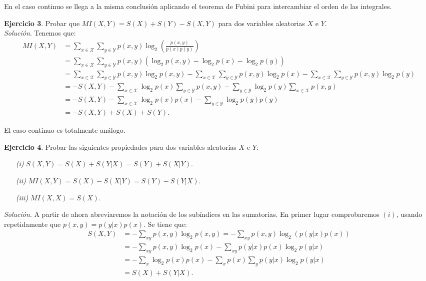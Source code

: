 \documentclass[11pt,a4paper]{article}
\begin{document}
En el caso continuo se llega a la misma conclusión aplicando el teorema de Fubini para intercambiar el orden de las integrales.

\vspace{1em}

\textbf{Ejercicio 3}. Probar que $MI(X,Y)=S(X)+S(Y) - S(X,Y)$ para dos variables aleatorias $X$ e $Y$.\\

\textit{Solución}. Tenemos que:
\begin{align*}
MI(X,Y) &= \sum_{x \in \mathcal X} \sum_{y \in \mathcal Y} p(x,y)\log_2 \left(\frac{p(x,y)}{p(x)p(y)}\right)\\
&= \sum_{x \in \mathcal X} \sum_{y \in \mathcal Y} p(x,y)(\log_2 p(x,y) - \log_2 p(x) -\log_2 p(y))\\
&= \sum_{x\in \mathcal X} \sum_{y\in \mathcal Y} p(x, y)\log_2 p(x, y) - \sum_{x\in \mathcal X} \sum_{y\in \mathcal Y} p(x, y)\log_2 p(x) - \sum_{x\in \mathcal X} \sum_{y\in \mathcal Y} p(x, y)\log_2 p(y)\\
&= -S(X,Y) - \sum_{x\in \mathcal X} \log_2 p(x) \sum_{y\in \mathcal Y} p(x,y) - \sum_{y\in \mathcal Y} \log_2 p(y) \sum_{x\in \mathcal X} p(x,y)\\
&= -S(X,Y) - \sum_{x\in \mathcal X} \log_2 p(x)p(x)  -\sum_{y\in \mathcal Y} \log_2 p(y)p(y) \\
&= -S(X,Y) + S(X) + S(Y).
\end{align*}

El caso continuo es totalmente análogo.

\vspace{1em}

\textbf{Ejercicio 4}. Probar las siguientes propiedades para dos variables aleatorias $X$ e $Y$:

\begin{enumerate}
  \item[\textit{(i)}] $S(X,Y) = S(X) + S(Y|X)=S(Y)+S(X|Y)$.
  \item[\textit{(ii)}] $MI(X,Y)=S(X)-S(X|Y)=S(Y)-S(Y|X)$.
  \item[\textit{(iii)}] $MI(X,X)=S(X)$.
\end{enumerate}

\textit{Solución}. A partir de ahora abreviaremos la notación de los subíndices en las sumatorias. En primer lugar comprobaremos $(i)$, usando repetidamente que $p(x,y)=p(y|x)p(x)$. Se tiene que:
\begin{align*}
S(X,Y) &= -\sum_{xy} p(x,y)\log_2 p(x,y) = - \sum_{xy} p(x,y)\log_2 (p(y|x)p(x))\\
&= -\sum_{xy}p(x,y)\log_2 p(x) - \sum_{xy}p(y|x)p(x)\log_2 p(y|x) \\
&= -\sum_x \log_2 p(x)p(x) - \sum_x p(x)\sum_y p(y|x)\log_2 p(y|x)\\
&= S(X) + S(Y|X).
\end{align*}
\end{document}
